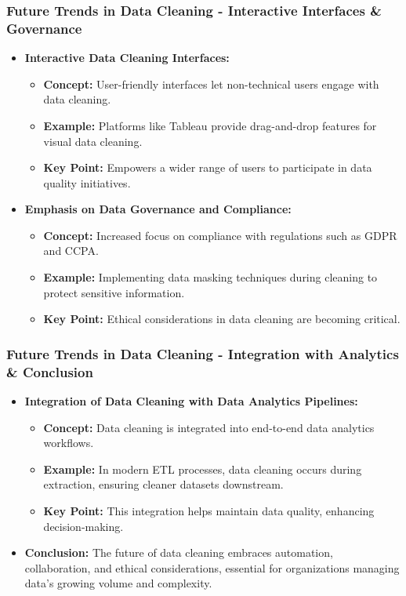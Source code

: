 \documentclass[aspectratio=169]{beamer}
\begin{document}
\begin{frame}[fragile]
  \frametitle{Future Trends in Data Cleaning - Interactive Interfaces & Governance}
  \begin{itemize}
    \item \textbf{Interactive Data Cleaning Interfaces:}
      \begin{itemize}
        \item \textbf{Concept:} User-friendly interfaces let non-technical users engage with data cleaning.
        \item \textbf{Example:} Platforms like Tableau provide drag-and-drop features for visual data cleaning.
        \item \textbf{Key Point:} Empowers a wider range of users to participate in data quality initiatives.
      \end{itemize}
  
    \item \textbf{Emphasis on Data Governance and Compliance:}
      \begin{itemize}
        \item \textbf{Concept:} Increased focus on compliance with regulations such as GDPR and CCPA.
        \item \textbf{Example:} Implementing data masking techniques during cleaning to protect sensitive information.
        \item \textbf{Key Point:} Ethical considerations in data cleaning are becoming critical.
      \end{itemize}
  \end{itemize}
\end{frame}

\begin{frame}[fragile]
  \frametitle{Future Trends in Data Cleaning - Integration with Analytics & Conclusion}
  \begin{itemize}
    \item \textbf{Integration of Data Cleaning with Data Analytics Pipelines:}
      \begin{itemize}
        \item \textbf{Concept:} Data cleaning is integrated into end-to-end data analytics workflows.
        \item \textbf{Example:} In modern ETL processes, data cleaning occurs during extraction, ensuring cleaner datasets downstream.
        \item \textbf{Key Point:} This integration helps maintain data quality, enhancing decision-making.
      \end{itemize}
  
    \item \textbf{Conclusion:} 
      The future of data cleaning embraces automation, collaboration, and ethical considerations, essential for organizations managing data's growing volume and complexity.
  \end{itemize}
\end{frame}
\end{document}
